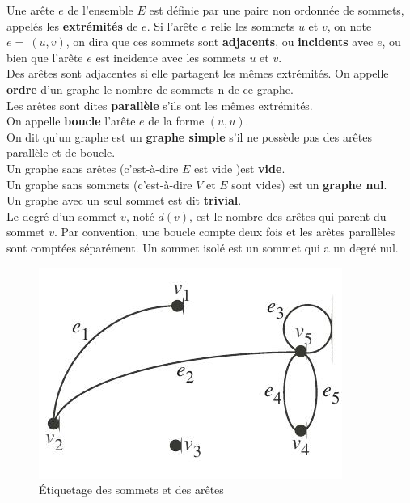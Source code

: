 \noindent Une arête $ e $ de l'ensemble $ E $ est définie par une paire non ordonnée de sommets, appelés
les \textbf{extrémités} de $ e $. Si l'arête $ e $ relie les sommets $ u $ et $ v $, on note $ e=\ (u,v) $, on dira que ces sommets sont
\textbf{adjacents}, ou \textbf{incidents} avec $ e $, ou bien que l'arête $ e $ est incidente avec 
les sommets $ u $ et $ v $.\\
Des arêtes sont adjacentes si elle partagent les mêmes extrémités.
On appelle \textbf{ordre} d'un graphe le nombre de sommets n de ce graphe.\\
Les arêtes sont dites \textbf{parallèle} s'ils ont les mêmes extrémités. \\
On appelle \textbf{boucle} l'arête $ e $ de la forme $ (u,u) $. \\
On dit qu'un graphe est un \textbf{graphe simple} s'il ne possède pas des arêtes parallèle et de boucle. \\
Un graphe sans arêtes (c'est-à-dire $E$ est vide )est \textbf{vide}.\\
Un graphe sans sommets (c'est-à-dire $V$ et $E$ sont vides) est un \textbf{graphe nul}.\\
Un graphe avec un seul sommet est dit \textbf{trivial}.\\
Le degré d'un sommet $v$, noté $d(v)$, est le nombre des arêtes qui parent du sommet $v$.
Par convention, une boucle compte deux fois et les arêtes parallèles sont comptées séparément.
Un sommet isolé est un sommet qui a un degré nul.


\begin{figure}[ht]
\centering
\includegraphics[width=0.5\linewidth]{images/graph1}
\caption[Étiquetage des sommets et des arêtes]{Étiquetage des sommets et des arêtes}
\label{fig:graph1}
\end{figure} 
